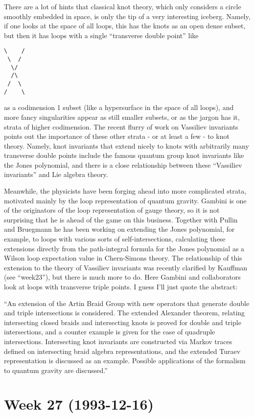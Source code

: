 \documentclass{article}
\begin{document}
There are a lot of hints that classical knot theory, which only
considers a circle smoothly embedded in space, is only the tip of a very
interesting iceberg. Namely, if one looks at the space of all loops,
this has the knots as an open dense subset, but then it has loops with a
single ``transverse double point'' like

\begin{verbatim}
\    /
 \  /
  \/
  /\
 /  \
/    \
\end{verbatim}

as a codimension 1 subset (like a hypersurface in the space of all
loops), and more fancy singularities appear as still smaller subsets, or
as the jargon has it, strata of higher codimension. The recent flurry of
work on Vassiliev invariants points out the importance of these other
strata - or at least a few - to knot theory. Namely, knot invariants
that extend nicely to knots with arbitrarily many transverse double
points include the famous quantum group knot invariants like the Jones
polynomial, and there is a close relationship between these ``Vassiliev
invariants'' and Lie algebra theory.

Meanwhile, the physicists have been forging ahead into more complicated
strata, motivated mainly by the loop representation of quantum gravity.
Gambini is one of the originators of the loop representation of gauge
theory, so it is not surprising that he is ahead of the game on this
business. Together with Pullin and Bruegmann he has been working on
extending the Jones polynomial, for example, to loops with various sorts
of self-intersections, calculating these extensions directly from the
path-integral formula for the Jones polynomial as a Wilson loop
expectation value in Chern-Simons theory. The relationship of this
extension to the theory of Vassiliev invariants was recently clarified
by Kauffman (see ``week23''), but there is much more to do. Here Gambini
and collaborators look at loops with transverse triple points. I guess
I'll just quote the abstract:

``An extension of the Artin Braid Group with new operators that generate
double and triple intersections is considered. The extended Alexander
theorem, relating intersecting closed braids and intersecting knots is
proved for double and triple intersections, and a counter example is
given for the case of quadruple intersections. Intersecting knot
invariants are constructed via Markov traces defined on intersecting
braid algebra representations, and the extended Turaev representation is
discussed as an example. Possible applications of the formalism to
quantum gravity are discussed.''
\hypertarget{week-27-1993-12-16}{%
\section{Week 27 (1993-12-16)}\label{week-27-1993-12-16}}
\end{document}
